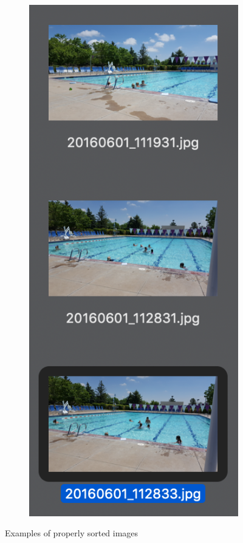 \documentclass[12pt]{article}
\begin{document}
\begin{figure}[H]
\begin{subfigure}[b]{.3\textwidth}
		\includegraphics[width=.7\textwidth]{images/correct_match_4.png}
	\end{subfigure}

	\caption{Examples of properly sorted images}
\end{figure}
\end{document}
